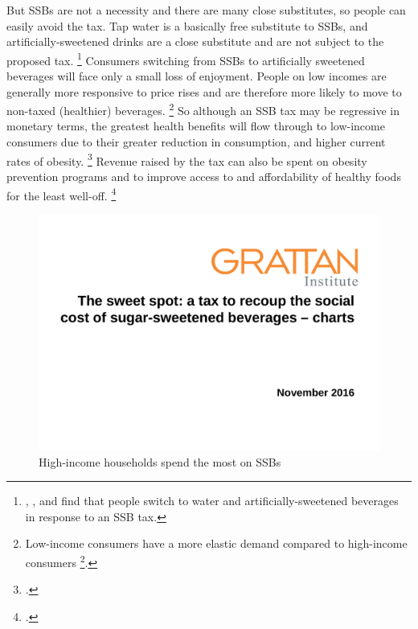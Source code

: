 \documentclass[embargoed]{grattan}
\begin{document}
But SSBs are not a necessity and there are many close substitutes, so people can easily avoid the tax.
Tap water is a basically free substitute to SSBs, and artificially-sweetened drinks are a close substitute and are not subject to the proposed tax.%
\footnote{\textcite{Briggs2013Overallincomespecific}, \textcite{Colchero2016Beveragepurchasesstores}, \textcite{Sharma2014effectstaxingsugarsweetened} and \textcite{Zhen2014Predictingeffectssugar} find that people switch to water and artificially-sweetened beverages in response to an SSB tax.}
Consumers switching from SSBs to artificially sweetened beverages will face only a small loss of enjoyment.
People on low incomes are generally more responsive to price rises and are therefore more likely to move to non-taxed (healthier) beverages.%
\footnote{Low-income consumers have a more elastic demand compared to high-income consumers \footcites{Yang2016child}{Colchero2016Beveragepurchasesstores}{Etile2015DoHighConsumers}{Briggs2013Overallincomespecific}.} So although an SSB tax may be regressive in monetary terms, the greatest health benefits will flow through to low-income consumers due to their greater reduction in consumption, and higher current rates of obesity.%
\footcites{Coalition2016Policybriefcase}{Organization2016FiscalPoliciesDiet}{Backholer2016impacttaxsugar} Revenue raised by the tax can also be spent on obesity prevention programs and to improve access to and affordability of healthy foods for the least well-off.%
\footcites{Wetter2016TaxingSugarSweetened}{Organization2016FiscalPoliciesDiet}

\begin{figure}
\caption{High-income households spend the most on SSBs}

\includegraphics[page=11]{atlas/ObesityCharts}


\end{figure}
\end{document}
